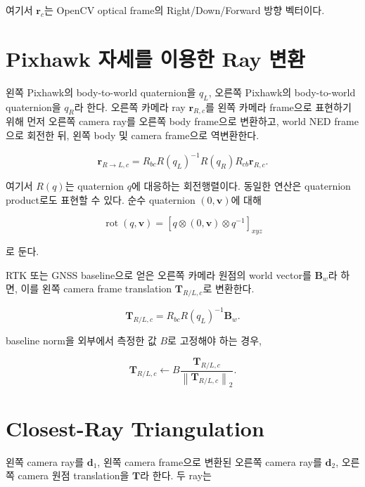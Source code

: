 \documentclass[10pt,conference]{IEEEtran}
\newcommand{\vect}[1]{\bm{#1}}
\newcommand{\norm}[1]{\left\lVert #1 \right\rVert_2}
\newcommand{\quat}{\otimes}
\begin{document}
여기서 $\vect{r}_c$는 OpenCV optical frame의 Right/Down/Forward 방향 벡터이다.

\section{Pixhawk 자세를 이용한 Ray 변환}

왼쪽 Pixhawk의 body-to-world quaternion을 $q_L$, 오른쪽 Pixhawk의 body-to-world quaternion을 $q_R$라 한다.
오른쪽 카메라 ray $\vect{r}_{R,c}$를 왼쪽 카메라 frame으로 표현하기 위해 먼저 오른쪽 camera ray를 오른쪽 body frame으로 변환하고, world NED frame으로 회전한 뒤, 왼쪽 body 및 camera frame으로 역변환한다.

\begin{equation}
\vect{r}_{R\rightarrow L,c}
=
R_{bc}
R(q_L)^{-1}
R(q_R)
R_{cb}
\vect{r}_{R,c}.
\label{eq:right_ray_to_left}
\end{equation}

여기서 $R(q)$는 quaternion $q$에 대응하는 회전행렬이다.
동일한 연산은 quaternion product로도 표현할 수 있다.
순수 quaternion $(0,\vect{v})$에 대해

\begin{equation}
\operatorname{rot}(q,\vect{v})
=
\left[
q \quat (0,\vect{v}) \quat q^{-1}
\right]_{xyz}
\end{equation}

로 둔다.

RTK 또는 GNSS baseline으로 얻은 오른쪽 카메라 원점의 world vector를 $\vect{B}_w$라 하면, 이를 왼쪽 camera frame translation $\vect{T}_{R/L,c}$로 변환한다.

\begin{equation}
\vect{T}_{R/L,c}
=
R_{bc}R(q_L)^{-1}\vect{B}_w.
\label{eq:baseline_camera}
\end{equation}

baseline norm을 외부에서 측정한 값 $B$로 고정해야 하는 경우,

\begin{equation}
\vect{T}_{R/L,c}
\leftarrow
B\frac{\vect{T}_{R/L,c}}{\norm{\vect{T}_{R/L,c}}}.
\end{equation}

\section{Closest-Ray Triangulation}

왼쪽 camera ray를 $\vect{d}_1$, 왼쪽 camera frame으로 변환된 오른쪽 camera ray를 $\vect{d}_2$, 오른쪽 camera 원점 translation을 $\vect{T}$라 한다.
두 ray는
\end{document}
